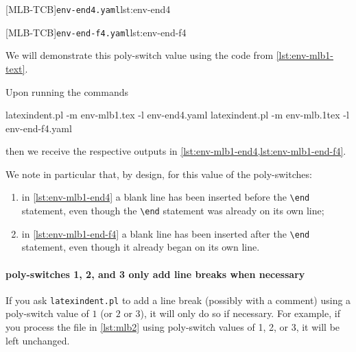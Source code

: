 		\begin{minipage}{.45\textwidth}
			{\texttt{env-end4.yaml}}{lst:env-end4}
		\end{minipage}
		\hfill
		\begin{minipage}{.5\textwidth}
			{\texttt{env-end-f4.yaml}}{lst:env-end-f4}
		\end{minipage}

		We will demonstrate this poly-switch value using the code from \vref{lst:env-mlb1-text}.

		Upon running the commands
		\begin{commandshell}
latexindent.pl -m env-mlb1.tex -l env-end4.yaml
latexindent.pl -m env-mlb.1tex -l env-end-f4.yaml
\end{commandshell}

		then we receive the respective outputs in \cref{lst:env-mlb1-end4,lst:env-mlb1-end-f4}.

		\begin{cmhtcbraster}[raster column skip=.1\linewidth]
		\end{cmhtcbraster}

		We note in particular that, by design, for this value of the poly-switches:
		\begin{enumerate}
			\item in \cref{lst:env-mlb1-end4} a blank line has been inserted before the
			      \lstinline!\end! statement, even though the \lstinline!\end!
			      statement was already on its own line;
			\item in \cref{lst:env-mlb1-end-f4} a blank line has been inserted after the
			      \lstinline!\end! statement, even though it already began on its own line.
		\end{enumerate}

	\paragraph{poly-switches 1, 2, and 3 only add line breaks when necessary}
		If you ask \texttt{latexindent.pl} to add a line break (possibly with a comment) using a
		poly-switch value of $1$ (or $2$ or $3$), it will only do so if necessary. For example,
		if you process the file in \vref{lst:mlb2} using poly-switch values of 1, 2, or 3, it
		will be left unchanged.

